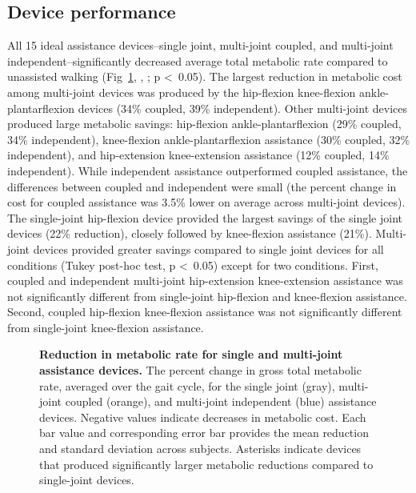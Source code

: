 \documentclass[10pt,letterpaper]{article}
\begin{document}
\subsection*{Device performance}
All 15 ideal assistance devices--single joint, multi-joint coupled, and multi-joint independent--significantly decreased average total metabolic rate compared to unassisted walking (Fig~\ref{Fig1}, , ; p \textless~0.05). The largest reduction in metabolic cost among multi-joint devices was produced by the hip-flexion knee-flexion ankle-plantarflexion devices (34\% coupled, 39\% independent). Other multi-joint devices produced large metabolic savings: hip-flexion ankle-plantarflexion (29\% coupled, 34\% independent), knee-flexion ankle-plantarflexion assistance (30\% coupled, 32\% independent), and hip-extension knee-extension assistance (12\% coupled, 14\% independent). While independent assistance outperformed coupled assistance, the differences between coupled and independent were small (the percent change in cost for coupled assistance was 3.5\% lower on average across multi-joint devices). The single-joint hip-flexion device provided the largest savings of the single joint devices (22\% reduction), closely followed by knee-flexion assistance (21\%). Multi-joint devices provided greater savings compared to single joint devices for all conditions (Tukey post-hoc test, p \textless~0.05) except for two conditions. First, coupled and independent multi-joint hip-extension knee-extension assistance was not significantly different from single-joint hip-flexion and knee-flexion assistance. Second, coupled hip-flexion knee-flexion assistance was not significantly different from single-joint knee-flexion assistance.  

\begin{figure}[!h]
\begin{adjustwidth}{-1in}{0in} %
    \centering
    \caption{{\bf Reduction in metabolic rate for single and multi-joint assistance devices.}
        The percent change in gross total metabolic rate, averaged over the gait cycle, for the single joint (gray), multi-joint coupled (orange), and multi-joint independent (blue) assistance devices. Negative values indicate decreases in metabolic cost. Each bar value and corresponding error bar provides the mean reduction and standard deviation across subjects. Asterisks indicate devices that produced significantly larger metabolic reductions compared to single-joint devices.}
\label{Fig1}
\end{adjustwidth}
\end{figure} 
\end{document}
